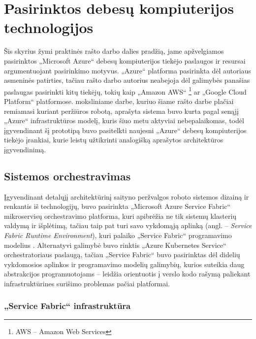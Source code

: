 \section{Pasirinktos debesų kompiuterijos technologijos}

Šis skyrius žymi praktinės rašto darbo dalies pradžią, jame apžvelgiamos pasirinktos „Microsoft Azure“ debesų kompiuterijos tiekėjo paslaugos ir resursai argumentuojant pasirinkimo motyvus. „Azure“ platforma pasirinkta dėl autoriaus asmeninės patirties, tačiau rašto darbo autorius neabejoja dėl galimybės panašias paslaugas pasirinkti kitų tiekėjų, tokių kaip „Amazon AWS“ \footnote{AWS -- Amazon Web Services} ar „Google Cloud Platform“ platformose. \cite{MercedCloudBasedWebCrawler} moksliniame darbe, kuriuo šiame rašto darbe plačiai remiamasi kuriant peržiūros robotą, aprašyta sistema  buvo kurta pagal senąjį „Azure“ infrastruktūros modelį, kuris šiuo metu aktyviai nebepalaikomas, todėl įgyvendinant šį prototipą buvo pasitelkti naujesni „Azure“ debesų kompiuterijos tiekėjo įrankiai, kurie leistų užtikrinti analogišką aprašytos architektūros įgyvendinimą.

\subsection{Sistemos orchestravimas}

Įgyvendinant detalųjį architektūrinį saityno peržvalgos roboto sistemos dizainą ir renkantis iš technologijų, buvo pasirinkta „Microsoft Azure Service Fabric“ mikroservisų orchestravimo platforma, kuri apibrėžia ne tik sistemų klasterių valdymą ir išplėtimą, tačiau taip pat turi savo vykdomąją aplinką (angl. -- \textit{Service Fabric Runtime Environment}), kuri palaiko „Service Fabric“ programavimo modelius \cite{ServiceFabricTerminology}. Alternatyvi galimybė buvo rinktis „Azure Kubernetes Service“ orchestratoriaus paslaugą, tačiau „Service Fabric“ buvo pasirinktas dėl didelių vykdomosios aplinkos ir programavimo modelių galimybių, kurios suteikia daug abstrakcijos programuotojams -- leidžia orientuotis į verslo kodo rašymą paliekant infrastruktūrines surišimo problemas pačiai platformai.

\subsubsection{„Service Fabric“ infrastruktūra}

